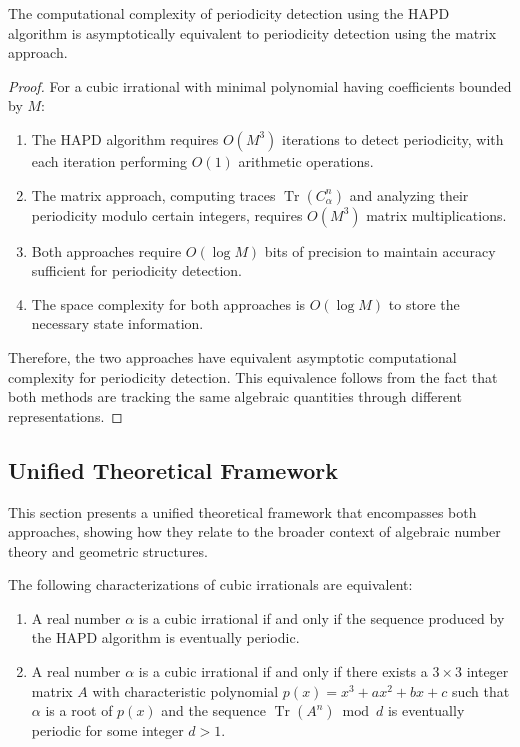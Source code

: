 \begin{theorem}\label{thm:comp_equiv}
The computational complexity of periodicity detection using the HAPD algorithm is asymptotically equivalent to periodicity detection using the matrix approach.
\end{theorem}

\begin{proof}
For a cubic irrational with minimal polynomial having coefficients bounded by $M$:

\begin{enumerate}
\item The HAPD algorithm requires $O(M^3)$ iterations to detect periodicity, with each iteration performing $O(1)$ arithmetic operations.

\item The matrix approach, computing traces $\operatorname{Tr}(C_{\alpha}^n)$ and analyzing their periodicity modulo certain integers, requires $O(M^3)$ matrix multiplications.

\item Both approaches require $O(\log M)$ bits of precision to maintain accuracy sufficient for periodicity detection.

\item The space complexity for both approaches is $O(\log M)$ to store the necessary state information.
\end{enumerate}

Therefore, the two approaches have equivalent asymptotic computational complexity for periodicity detection. This equivalence follows from the fact that both methods are tracking the same algebraic quantities through different representations.
\end{proof}

\subsection{Unified Theoretical Framework}

This section presents a unified theoretical framework that encompasses both approaches, showing how they relate to the broader context of algebraic number theory and geometric structures.

\begin{theorem}\label{thm:unified_char}
The following characterizations of cubic irrationals are equivalent:
\begin{enumerate}
\item A real number $\alpha$ is a cubic irrational if and only if the sequence produced by the HAPD algorithm is eventually periodic.
\item A real number $\alpha$ is a cubic irrational if and only if there exists a $3 \times 3$ integer matrix $A$ with characteristic polynomial $p(x) = x^3 + ax^2 + bx + c$ such that $\alpha$ is a root of $p(x)$ and the sequence $\operatorname{Tr}(A^n) \bmod d$ is eventually periodic for some integer $d > 1$.
\end{enumerate}
\end{theorem}

